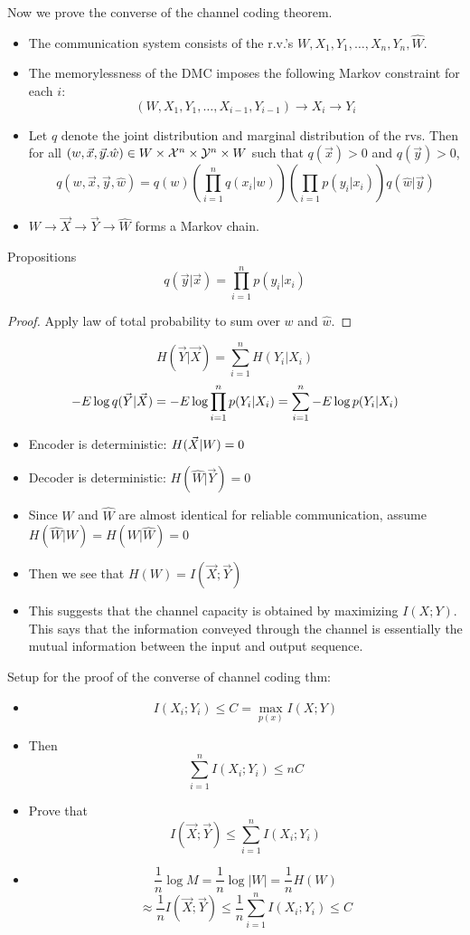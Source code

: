 \documentclass[../main.tex]{subfiles}
\begin{document}
Now we prove the converse of the channel coding theorem.
\begin{itemize}
    \item The communication system consists of the r.v.'s $W,X_1,Y_1,\dots,X_n,Y_n,\hat{W}$.
    \item The memorylessness of the DMC imposes the following Markov constraint for each $i:$\[
    (W,X_1,Y_1,\dots, X_{i-1},Y_{i-1})\to X_i\to Y_i
    \]
    \item Let $q$ denote the joint distribution and marginal distribution of the rvs. Then for all $(w,\vec x,\vec y.\hat{w})\in W\times \mathcal{X}^n\times \mathcal{Y}^n\times W$ such that $q(\vec x)>0$ and $q(\vec y)>0$,
    \[
    q(w,\vec x,\vec y, \hat{w})=q(w)(\prod_{i=1}^nq(x_i|w))(\prod_{i=1}p(y_i|x_i))q(\hat{w}|\vec y)
    \]
    \item $W\to \vec X\to \vec Y\to \hat{W}$ forms a Markov chain.
\end{itemize}
\begin{bbox}{Propositions}
    \[
    q(\vec y|\vec x)=\prod_{i=1}^n p(y_i|x_i)
    \]
    \begin{proof}
        Apply law of total probability to sum over $w$ and $\hat{w}$.
    \end{proof}
    \[
    H(\vec Y|\vec X)=\sum_{i=1}^n H(Y_i|X_i)
    \]
    \[
    -E\log q(\vec Y|\vec X)=-E\log \prod_{i=1}^np(Y_i|X_i)=\sum_{i=1}^n-E\log p(Y_i|X_i)
    \]
\end{bbox}

\begin{itemize}
    \item Encoder is deterministic: $H(\vec X|W)=0$
    \item Decoder is deterministic: $H(\hat{W}|\vec Y)=0$
    \item Since $W$ and $\hat{W}$ are almost identical for reliable communication, assume $H(\hat{W}|W)=H(W|\hat{W})=0$
    \item Then we see that $H(W)=I(\vec X;\vec Y)$
    \item This suggests that the channel capacity is obtained by maximizing $I(X;Y)$. This says that the information conveyed through the channel is essentially the mutual information between the input and output sequence.
\end{itemize}
Setup for the proof of the converse of channel coding thm:
\begin{itemize}
    \item \[
    I(X_i;Y_i)\leq C=\max_{p(x)}I(X;Y)
    \]
    \item Then \[
    \sum_{i=1}^nI(X_i;Y_i)\leq nC
    \]
    \item Prove that \[
    I(\vec X;\vec Y)\leq \sum_{i=1}^n I(X_i;Y_i)
    \]
    \item \[
    \frac{1}{n}\log M=\frac{1}{n}\log |W|=\frac{1}{n}H(W)
    \]
    \[
    \approx \frac{1}{n}I(\vec X;\vec Y)\leq \frac{1}{n}\sum_{i=1}^nI(X_i;Y_i)\leq C
    \]
\end{itemize}
\end{document}
